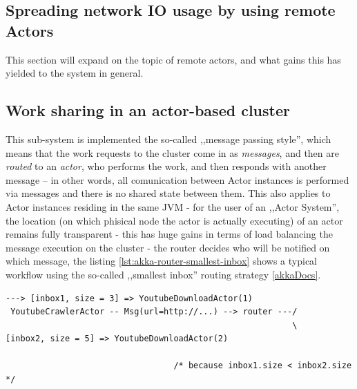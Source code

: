 \subsection{Spreading network IO usage by using remote Actors}
\label{sec:location-transparency}

This section will expand on the topic of remote actors, and what gains this has yielded to the system in general.



\subsection{Work sharing in an actor-based cluster}


This sub-system is implemented the so-called ,,message passing style'', which means that the work requests to the cluster come in as \textit{messages}, and then are \textit{routed} to an \textit{actor}, who performs the work, and then responds with another message -- in other words, all comunication between Actor instances is performed via messages and there is no shared state between them. 
This also applies to Actor instances residing in the same JVM - for the user of an ,,Actor System'', the location (on which phisical node the actor is actually executing) of an actor remains fully transparent - this has huge gains in terms of load balancing the message execution on the cluster - the router decides who will be notified on which message, the listing \ref{lst:akka-router-smallest-inbox} shows a typical workflow using the so-called ,,smallest inbox'' routing strategy \ref{akkaDocs}.

\begin{lstlisting}[caption={smallest-inbox routing algorithm},label={lst:akka-router-smallest-inbox}]
                                                           ---> [inbox1, size = 3] => YoutubeDownloadActor(1)
 YoutubeCrawlerActor -- Msg(url=http://...) --> router ---/
                                                          \     [inbox2, size = 5] => YoutubeDownloadActor(2)
                                                                   
                                  /* because inbox1.size < inbox2.size */ 
\end{lstlisting}

